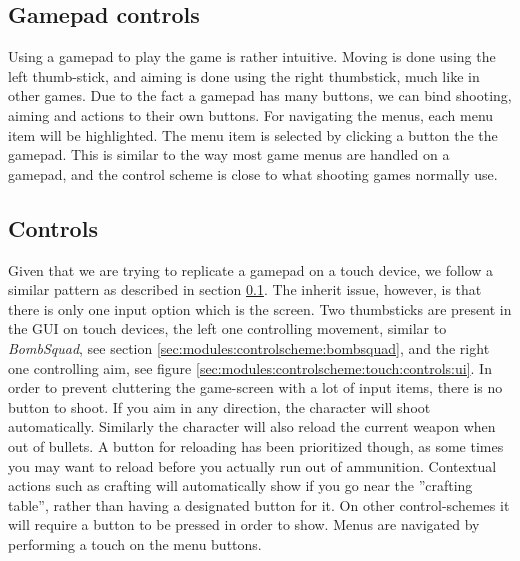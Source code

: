 
\subsection{Gamepad controls}\label{sec:modules:controlscheme:gamepad:controls}
Using a gamepad to play the game is rather intuitive. Moving is done using the left thumb-stick, and aiming is done using the right thumbstick, much like in other games.
Due to the fact a gamepad has many buttons, we can bind shooting, aiming and actions to their own buttons. 
For navigating the menus, each menu item will be highlighted. The menu item is selected by clicking a button the the gamepad.
This is similar to the way most game menus are handled on a gamepad, and the control scheme is close to what shooting games normally use.

\subsection{Controls}
Given that we are trying to replicate a gamepad on a touch device, we follow a similar pattern as described in section \ref{sec:modules:controlscheme:gamepad:controls}. The inherit issue, however, is that  there is only one input option which is the screen. 
Two thumbsticks are present in the GUI on touch devices, the left one controlling movement, similar to \textit{BombSquad}, see section \ref{sec:modules:controlscheme:bombsquad}, and the right one controlling aim, see figure \ref{sec:modules:controlscheme:touch:controls:ui}.
In order to prevent cluttering the game-screen with a lot of input items, there is no button to shoot. If you aim in any direction, the character will shoot automatically. Similarly the character will also reload the current weapon when out of bullets. A button for reloading has been prioritized though, as some times you may want to reload before you actually run out of ammunition.
Contextual actions such as crafting will automatically show if you go near the ''crafting table'', rather than having a designated button for it. On other control-schemes it will require a button to be pressed in order to show.
Menus are navigated by performing a touch on the menu buttons. 

